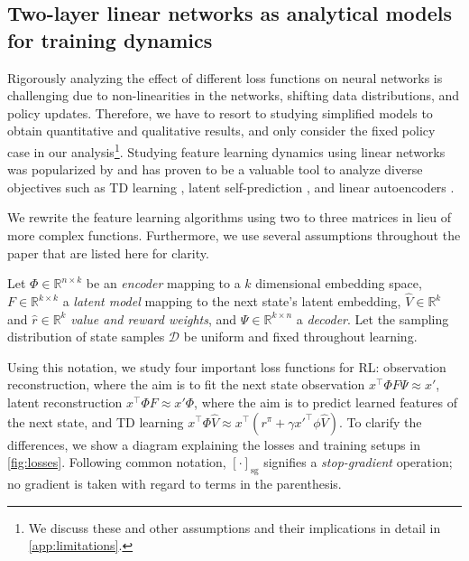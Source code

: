 \subsection{Two-layer linear networks as analytical models for training dynamics}
\label{sec:background}

Rigorously analyzing the effect of different loss functions on neural networks is challenging due to non-linearities in the networks, shifting data distributions, and policy updates.
Therefore, we have to resort to studying simplified models to obtain quantitative and qualitative results, and only consider the fixed policy case in our analysis\footnote{We discuss these and other assumptions and their implications in detail in \autoref{app:limitations}.}.
Studying feature learning dynamics using linear networks was popularized by \textcite{saxe2014exact} and has proven to be a valuable tool to analyze diverse objectives such as TD learning \parencite{tang2023towards,lelan2023bootstrapped}, latent self-prediction \parencite{tian2021understanding,tang2022understanding}, and linear autoencoders \parencite{pretorius2018learning,bao2020regularized}.

We rewrite the feature learning algorithms using two to three matrices in lieu of more complex functions. Furthermore, we use several assumptions throughout the paper that are listed here for clarity.

\begin{assumption}
\label{assumption1}
Let $\Phi \in \mathbb{R}^{n \times k}$ be an \emph{encoder} mapping to a $k$ dimensional embedding space,
$F \in \mathbb{R}^{k\times k}$ a \emph{latent model} mapping to the next state's latent embedding, $\hat{V} \in \mathbb{R}^{k}$ and $\hat{r} \in \mathbb{R}^{k}$ \emph{value and reward weights}, and $\Psi \in \mathbb{R}^{k \times n}$ a \emph{decoder}.
Let the sampling distribution of state samples $\mathcal{D}$ be uniform and fixed throughout learning.
\end{assumption}

Using this notation, we study four important loss functions for RL: observation reconstruction, where the aim is to fit the next state observation $x^\top \Phi F \Psi \approx x'$, latent reconstruction $x^\top \Phi F \approx x' \Phi$, where the aim is to predict learned features of the next state, and TD learning $x^\top \Phi \hat{V} \approx x^\top(r^\pi + \gamma x'^\top\phi \hat{V})$. To clarify the differences, we show a diagram explaining the losses and training setups in \autoref{fig:losses}.
Following common notation, $[\cdot]_\mathrm{sg}$ signifies a \emph{stop-gradient} operation; no gradient is taken with regard to terms in the parenthesis.


